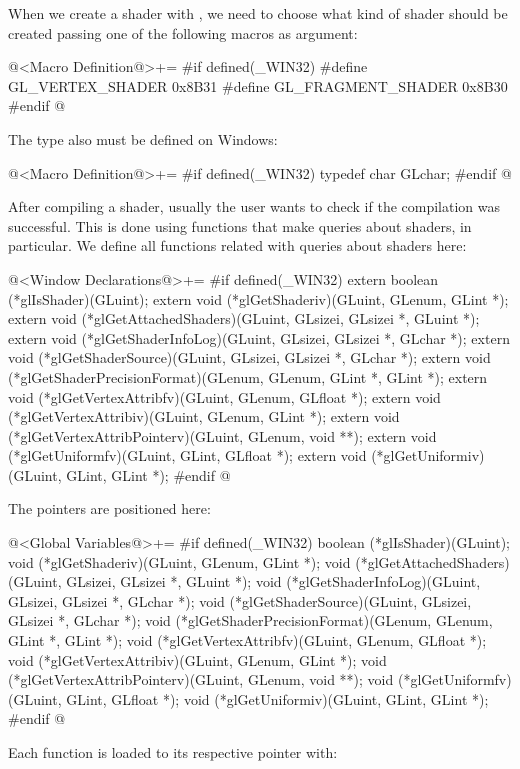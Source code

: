When we create a shader with , we need to
choose what kind of shader should be created passing one of the
following macros as argument:

\iniciocodigo
@<Macro Definition@>+=
#if defined(_WIN32)
#define GL_VERTEX_SHADER          0x8B31
#define GL_FRAGMENT_SHADER        0x8B30
#endif
@
\fimcodigo

The type  also must be defined on Windows:

\iniciocodigo
@<Macro Definition@>+=
#if defined(_WIN32)
typedef char GLchar;
#endif
@
\fimcodigo


After compiling a shader, usually the user wants to check if the
compilation was successful. This is done using functions that make
queries about shaders,  in particular. We
define all functions related with queries about shaders here:

\iniciocodigo
@<Window Declarations@>+=
#if defined(_WIN32)
extern boolean (*glIsShader)(GLuint);
extern void (*glGetShaderiv)(GLuint, GLenum, GLint *);
extern void (*glGetAttachedShaders)(GLuint, GLsizei, GLsizei *, GLuint *);
extern void (*glGetShaderInfoLog)(GLuint, GLsizei, GLsizei *, GLchar *);
extern void (*glGetShaderSource)(GLuint, GLsizei, GLsizei *, GLchar *);
extern void (*glGetShaderPrecisionFormat)(GLenum, GLenum, GLint *, GLint *);
extern void (*glGetVertexAttribfv)(GLuint, GLenum, GLfloat *);
extern void (*glGetVertexAttribiv)(GLuint, GLenum, GLint *);
extern void (*glGetVertexAttribPointerv)(GLuint, GLenum, void **);
extern void (*glGetUniformfv)(GLuint, GLint, GLfloat *);
extern void (*glGetUniformiv)(GLuint, GLint, GLint *);
#endif
@
\fimcodigo

The pointers are positioned here:

\iniciocodigo
@<Global Variables@>+=
#if defined(_WIN32)
boolean (*glIsShader)(GLuint);
void (*glGetShaderiv)(GLuint, GLenum, GLint *);
void (*glGetAttachedShaders)(GLuint, GLsizei, GLsizei *, GLuint *);
void (*glGetShaderInfoLog)(GLuint, GLsizei, GLsizei *, GLchar *);
void (*glGetShaderSource)(GLuint, GLsizei, GLsizei *, GLchar *);
void (*glGetShaderPrecisionFormat)(GLenum, GLenum, GLint *, GLint *);
void (*glGetVertexAttribfv)(GLuint, GLenum, GLfloat *);
void (*glGetVertexAttribiv)(GLuint, GLenum, GLint *);
void (*glGetVertexAttribPointerv)(GLuint, GLenum, void **);
void (*glGetUniformfv)(GLuint, GLint, GLfloat *);
void (*glGetUniformiv)(GLuint, GLint, GLint *);
#endif
@
\fimcodigo

Each function is loaded to its respective pointer with:

